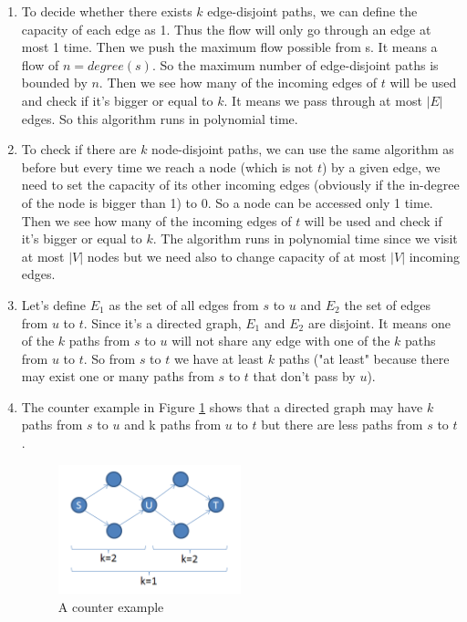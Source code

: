 \begin{enumerate}
	\item To decide whether there exists $k$ edge-disjoint paths, we can define the capacity of each edge as 1. Thus the flow will only go through an edge at most 1 time. Then we push the maximum flow possible from s. It means a flow of $n=degree(s)$. So the maximum number of edge-disjoint paths is bounded by $n$. Then we see how many of the incoming edges of $t$ will be used and check if it's bigger or equal to $k$. It means we pass through at most $|E|$ edges. So this algorithm runs in polynomial time.
	\item To check if there are $k$ node-disjoint paths, we can use the same algorithm as before but every time we reach a node (which is not $t$) by a given edge, we need to set the capacity of its other incoming edges (obviously if the in-degree of the node is bigger than 1) to 0. So a node can be accessed only 1 time. Then we see how many of the incoming edges of $t$ will be used and check if it's bigger or equal to $k$. The algorithm runs in polynomial time since we visit at most $|V|$ nodes but we need also to change capacity of at most $|V|$ incoming edges.
	\item Let's define $E_1$ as the set of all edges from $s$ to $u$ and $E_2$ the set of edges from $u$ to $t$. Since it's a directed graph, $E_1$ and $E_2$ are disjoint. It means one of the $k$ paths from $s$ to $u$ will not share any edge with one of the $k$ paths from $u$ to $t$. So from $s$ to $t$ we have at least $k$ paths ("at least" because there may exist one or many paths from $s$ to $t$ that don't pass by $u$).
	\item The counter example in Figure \ref{fig:prob1} shows that a directed graph may have $k$ paths from $s$ to $u$ and k paths from $u$ to $t$ but there are less paths from $s$ to $t$.
	\begin{figure}[ht]
  \centering
  \includegraphics[width=0.5\textwidth]{prob1}
  \caption{A counter example}
  \label{fig:prob1}
  \end{figure}
\end{enumerate}